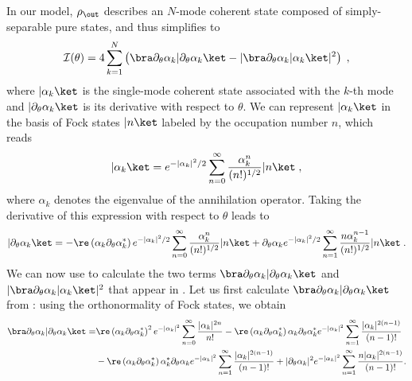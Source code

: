 \documentclass[aps,pra,twocolumn,amsmath,amssymb,superscriptaddress,10pt,nobibnotes]{revtex4-2}
\begin{document}
In our model, $\rho_\out$ describes an $N$-mode coherent state composed of simply-separable pure states, and thus  simplifies to~\cite{braunstein_generalized_1996_1,demkowicz-dobrzanski_chapter_2015_1}
\begin{equation}
\mathcal{I}(\theta)= 4 \sum_{k=1}^N \left( \bra \partial_\theta \alpha_k | \partial_\theta \alpha_k \ket - |\bra \partial_\theta \alpha_k| \alpha_k \ket|^2 \right) \; ,
\label{quantum_fisher_pure}
\end{equation}
where $|\alpha_k \ket$ is the single-mode coherent state associated with the $k$-th mode and $| \partial_\theta \alpha_k \ket $ is its derivative with respect to $\theta$. We can represent $|\alpha_k \ket$ in the basis of Fock states $|n\ket$ labeled by the occupation number $n$, which reads~\cite{mandel_optical_1995_1}
\begin{equation}
|\alpha_k \ket = e^{- |\alpha_k|^2/2} \sum_{n=0}^{\infty} \frac{\alpha_k^n}{(n!)^{1/2}} |n\ket \; ,
\label{coherent_state}
\end{equation}
where $\alpha_k$ denotes the eigenvalue of the annihilation operator. Taking the derivative of this expression with respect to $\theta$ leads to
\begin{equation}
|\partial_\theta \alpha_k \ket = -\re \left( \alpha_k \partial_\theta \alpha_k^* \right) 
e^{- |\alpha_k|^2/2} \sum_{n=0}^{\infty} \frac{\alpha_k^n}{(n!)^{1/2}} |n\ket + \partial_\theta \alpha_k e^{- |\alpha_k|^2/2} \sum_{n=1}^{\infty} \frac{n\alpha_k^{n-1}}{(n!)^{1/2}} |n\ket  \; .
\label{der_coherent_state}
\end{equation}
We can now use  to calculate the two terms $\bra \partial_\theta \alpha_k | \partial_\theta \alpha_k \ket$ and $|\bra \partial_\theta \alpha_k | \alpha_k \ket|^2$ that appear in . Let us first calculate $\bra \partial_\theta \alpha_k | \partial_\theta \alpha_k \ket$ from : using the orthonormality of Fock states, we obtain
\begin{equation}
\begin{split}
\bra \partial_\theta \alpha_k | \partial_\theta \alpha_k \ket =&   \re  \left( \alpha_k \partial_\theta \alpha_k^* \right) ^2
e^{- |\alpha_k|^2} \sum_{n=0}^{\infty} \frac{|\alpha_k|^{2n}}{n!}  -  \re \left( \alpha_k \partial_\theta \alpha_k^* \right) \alpha_k \partial_\theta \alpha_k^* e^{- |\alpha_k|^2} \sum_{n=1}^{\infty} \frac{|\alpha_k|^{2(n-1)}}{(n-1)!}  \\
&  -  \re \left( \alpha_k \partial_\theta \alpha_k^* \right) \alpha_k^* \partial_\theta \alpha_k e^{- |\alpha_k|^2} \sum_{n=1}^{\infty} \frac{|\alpha_k|^{2(n-1)}}{(n-1)!} + |\partial_\theta \alpha_k|^2 e^{- |\alpha_k|^2} \sum_{n=1}^{\infty} \frac{n |\alpha_k|^{2(n-1)}}{(n-1)!} .
\end{split}
\label{term1_expanded}
\end{equation}
\end{document}
